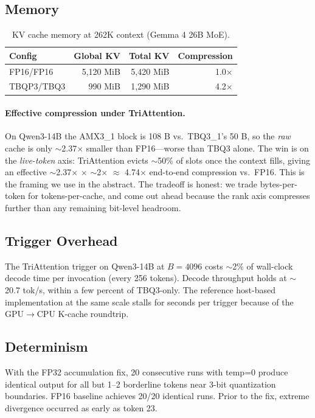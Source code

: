 \documentclass[10pt,twocolumn]{article}
\begin{document}
\subsection{Memory}

\begin{table}[h]
\centering
\small
\begin{tabular}{@{}lrrr@{}}
\toprule
Config & Global KV & Total KV & Compression \\
\midrule
FP16/FP16 & 5,120 MiB & 5,420 MiB & 1.0$\times$ \\
TBQP3/TBQ3 & 990 MiB & 1,290 MiB & 4.2$\times$ \\
\bottomrule
\end{tabular}
\caption{KV cache memory at 262K context (Gemma 4 26B MoE).}
\label{tab:memory}
\end{table}

\paragraph{Effective compression under TriAttention.}
On Qwen3-14B the AMX3\_1 block is 108 B vs.\ TBQ3\_1's 50 B, so the \emph{raw} cache is only $\sim$2.37$\times$ smaller than FP16---worse than TBQ3 alone. The win is on the \emph{live-token} axis: TriAttention evicts $\sim$50\% of slots once the context fills, giving an effective $\sim$2.37$\times$ $\times$ $\sim$2$\times$ $\approx$ 4.74$\times$ end-to-end compression vs.\ FP16. This is the framing we use in the abstract. The tradeoff is honest: we trade bytes-per-token for tokens-per-cache, and come out ahead because the rank axis compresses further than any remaining bit-level headroom.

\subsection{Trigger Overhead}

The TriAttention trigger on Qwen3-14B at $B=4096$ costs $\sim$2\% of wall-clock decode time per invocation (every 256 tokens). Decode throughput holds at $\sim$20.7 tok/s, within a few percent of TBQ3-only. The reference host-based implementation at the same scale stalls for seconds per trigger because of the GPU$\to$CPU K-cache roundtrip.

\subsection{Determinism}

With the FP32 accumulation fix, 20 consecutive runs with temp=0 produce identical output for all but 1--2 borderline tokens near 3-bit quantization boundaries. FP16 baseline achieves 20/20 identical runs. Prior to the fix, extreme divergence occurred as early as token 23.
\end{document}

